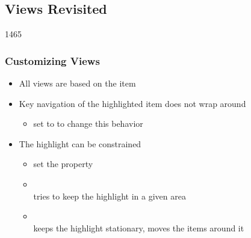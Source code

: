%
%
%
%

\subsection{Views Revisited}

\begin{slide}{1465}\frametitle{Customizing Views}

\begin{itemize}
\item All views are based on the  item
\item Key navigation of the highlighted item does not wrap around
  \begin{itemize}
  \item set  to  to change this behavior
  \end{itemize}
\item The highlight can be constrained
  \begin{itemize}
  \item set the  property
  \item {}\\
        tries to keep the highlight in a given area
  \item {}\\
        keeps the highlight stationary, moves the items around it
  \end{itemize}
\end{itemize}

\end{slide}


